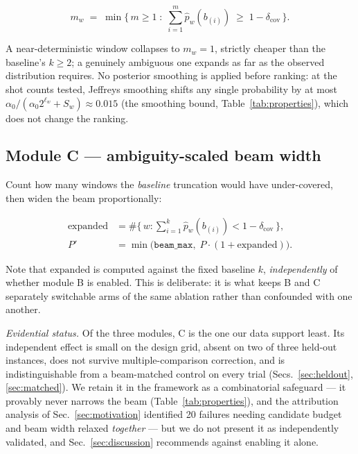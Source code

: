 \documentclass[preprint,11pt]{elsarticle}
\newcommand{\dcov}{\delta_{\mathrm{cov}}}
\newcommand{\beammax}{\texttt{beam\_max}}
\begin{document}
\begin{equation}
m_w \;=\; \min\Big\{\, m \ge 1 \;:\; \sum_{i=1}^{m}\hat p_w(b_{(i)}) \;\ge\; 1-\dcov \,\Big\}.
\label{eq:moduleB}
\end{equation}

A near-deterministic window collapses to $m_w=1$, strictly cheaper than
the baseline's $k\ge2$; a genuinely ambiguous one expands as far as the
observed distribution requires. No posterior smoothing is applied before
ranking: at the shot counts tested, Jeffreys smoothing shifts any single
probability by at most $\alpha_0/(\alpha_0 2^{\ell_w}+S_w)\approx0.015$
(the smoothing bound, Table~\ref{tab:properties}), which does not
change the ranking.

\subsection{Module C --- ambiguity-scaled beam width}
\label{sec:moduleC}

Count how many windows the \emph{baseline} truncation would have
under-covered, then widen the beam proportionally:

\begin{align}
\mathrm{expanded} &= \#\Big\{\, w : \sum_{i=1}^{k}\hat p_w(b_{(i)}) < 1-\dcov \,\Big\},
\label{eq:expanded}\\[2pt]
P' &= \min\!\big(\beammax,\; P\cdot(1+\mathrm{expanded})\big).
\label{eq:moduleC}
\end{align}

Note that $\mathrm{expanded}$ is computed against the fixed baseline $k$,
\emph{independently} of whether module B is enabled. This is deliberate:
it is what keeps B and C separately switchable arms of the same ablation
rather than confounded with one another.

\emph{Evidential status.} Of the three modules, C is the one our data
support least. Its independent effect is small on the design grid, absent
on two of three held-out instances, does not survive multiple-comparison
correction, and is indistinguishable from a beam-matched control on every
trial (Secs.~\ref{sec:heldout}, \ref{sec:matched}). We retain it in the
framework as a combinatorial safeguard --- it provably never narrows the
beam (Table~\ref{tab:properties}), and the attribution analysis of
Sec.~\ref{sec:motivation} identified 20 failures needing candidate budget
and beam width relaxed \emph{together} --- but we do not present it as
independently validated, and Sec.~\ref{sec:discussion} recommends against
enabling it alone.
\end{document}

